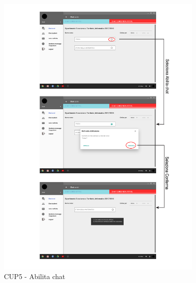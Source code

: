 \begin{figure}
	\centering
	\includegraphics[width=0.9\textwidth]{imgs/gruppo6/activities/act_cup5_abilita_chat.pdf}
	\caption{CUP5 - Abilita chat}
	\label{fig:cup5}
\end{figure}

